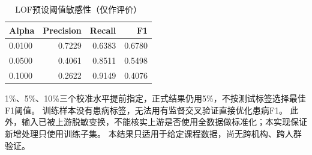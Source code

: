 \begin{table}[tbp]\caption{LOF预设阈值敏感性（仅作评价）}\label{tab:m3sensitivity}\centering
\setlength{\tabcolsep}{3pt}\begin{tabular}{lrrr}
\toprule
Alpha & Precision & Recall & F1\\
\midrule
0.0100 & 0.7229 & 0.6383 & 0.6780\\
0.0500 & 0.4061 & 0.8511 & 0.5498\\
0.1000 & 0.2622 & 0.9149 & 0.4076\\
\bottomrule\end{tabular}\end{table}
1\%、5\%、10\%三个校准水平提前指定，正式结果仍用5\%，不按测试标签选择最佳F1阈值。
训练样本没有患病标签，无法用有监督交叉验证直接优化患病F1。
此外，输入已被上游脱敏变换，不能核实上游是否使用全数据做标准化；本实现保证新增处理只使用训练子集。
本结果只适用于给定课程数据，尚无跨机构、跨人群验证。
\FloatBarrier
